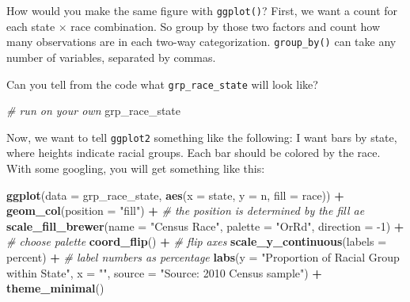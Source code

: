 \documentclass[]{book}
\newenvironment{Shaded}{\begin{snugshade}}{\end{snugshade}}
\newcommand{\CommentTok}[1]{\textcolor[rgb]{0.56,0.35,0.01}{\textit{#1}}}
\newcommand{\DataTypeTok}[1]{\textcolor[rgb]{0.13,0.29,0.53}{#1}}
\newcommand{\DecValTok}[1]{\textcolor[rgb]{0.00,0.00,0.81}{#1}}
\newcommand{\KeywordTok}[1]{\textcolor[rgb]{0.13,0.29,0.53}{\textbf{#1}}}
\newcommand{\NormalTok}[1]{#1}
\newcommand{\OperatorTok}[1]{\textcolor[rgb]{0.81,0.36,0.00}{\textbf{#1}}}
\newcommand{\StringTok}[1]{\textcolor[rgb]{0.31,0.60,0.02}{#1}}
\theoremstyle{definition}
\theoremstyle{definition}
\theoremstyle{definition}
\theoremstyle{remark}
\begin{document}
\begin{Shaded}
\begin{Highlighting}[]
\begin{Shaded}
\begin{Highlighting}[]
How would you make the same figure with \texttt{ggplot()}? First, we want a count for each state \(\times\) race combination. So group by those two factors and count how many observations are in each two-way categorization. \texttt{group\_by()} can take any number of variables, separated by commas.

\begin{Shaded}
\end{Shaded}

Can you tell from the code what \texttt{grp\_race\_state} will look like?

\begin{Shaded}
\begin{Highlighting}[]
\CommentTok{# run on your own}
\NormalTok{grp_race_state}
\end{Highlighting}
\end{Shaded}

Now, we want to tell \texttt{ggplot2} something like the following: I want bars by state, where heights indicate racial groups. Each bar should be colored by the race. With some googling, you will get something like this:

\begin{Shaded}
\begin{Highlighting}[]
\KeywordTok{ggplot}\NormalTok{(}\DataTypeTok{data =}\NormalTok{ grp_race_state, }\KeywordTok{aes}\NormalTok{(}\DataTypeTok{x =}\NormalTok{  state, }\DataTypeTok{y =}\NormalTok{ n,  }\DataTypeTok{fill =}\NormalTok{ race)) }\OperatorTok{+}
\StringTok{  }\KeywordTok{geom_col}\NormalTok{(}\DataTypeTok{position =} \StringTok{"fill"}\NormalTok{) }\OperatorTok{+}\StringTok{ }\CommentTok{# the position is determined by the fill ae}
\StringTok{  }\KeywordTok{scale_fill_brewer}\NormalTok{(}\DataTypeTok{name =} \StringTok{"Census Race"}\NormalTok{, }\DataTypeTok{palette =} \StringTok{"OrRd"}\NormalTok{, }\DataTypeTok{direction =} \DecValTok{-1}\NormalTok{) }\OperatorTok{+}\StringTok{ }\CommentTok{# choose palette}
\StringTok{  }\KeywordTok{coord_flip}\NormalTok{() }\OperatorTok{+}\StringTok{ }\CommentTok{# flip axes}
\StringTok{  }\KeywordTok{scale_y_continuous}\NormalTok{(}\DataTypeTok{labels =}\NormalTok{ percent) }\OperatorTok{+}\StringTok{ }\CommentTok{# label numbers as percentage}
\StringTok{  }\KeywordTok{labs}\NormalTok{(}\DataTypeTok{y =} \StringTok{"Proportion of Racial Group within State"}\NormalTok{,}
       \DataTypeTok{x =} \StringTok{""}\NormalTok{,}
       \DataTypeTok{source =} \StringTok{"Source: 2010 Census  sample"}\NormalTok{) }\OperatorTok{+}
\StringTok{  }\KeywordTok{theme_minimal}\NormalTok{()}
\end{Highlighting}
\end{Shaded}


\end{Highlighting}
\end{Shaded}
\end{Highlighting}
\end{Shaded}
\end{document}
